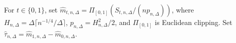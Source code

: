 For \(t\in\{0,1\}\), set \(\widehat m_{t,n,\Delta}=\Pi_{[0,1]}\!\left(S_{t,n,\Delta}/(n p_{n,\Delta})\right)\), where \(H_{n,\Delta}=\Delta\lceil n^{-1/4}/\Delta\rceil\), \(p_{n,\Delta}=H_{n,\Delta}^2/2\), and \(\Pi_{[0,1]}\) is Euclidean clipping. Set \(\widehat\tau_{n,\Delta}=\widehat m_{1,n,\Delta}-\widehat m_{0,n,\Delta}\).